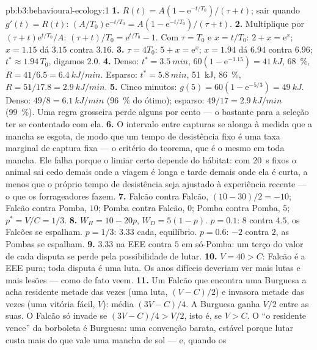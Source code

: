 \begin{solution}{pb:b3:behavioural-ecology:1}
\textbf{1.} $R(t) = A(1 - \mathrm{e}^{-t/T_{0}})/(\tau + t)$; sair quando
$g'(t) = R(t)$: $(A/T_{0})\mathrm{e}^{-t/T_{0}} = A(1 - \mathrm{e}^{-t/T_{0}})/
(\tau + t)$.
\textbf{2.} Multiplique por $(\tau + t)\mathrm{e}^{t/T_{0}}/A$: $(\tau + t)/T_{0}
= \mathrm{e}^{t/T_{0}} - 1$. Com $\tau = T_{0}$ e $x = t/T_{0}$: $2 + x =
\mathrm{e}^{x}$; $x = 1.15$ dá $3.15$ contra $3.16$.
\textbf{3.} $\tau = 4T_{0}$: $5 + x = \mathrm{e}^{x}$; $x = 1.94$ dá
$6.94$ contra $6.96$; $t^{*} \approx 1.94\,T_{0}$, digamos $2.0$.
\textbf{4.} Denso: $t^{*} = \qty{3.5}{min}$, $60(1 - \mathrm{e}^{-1.15}) =
\qty{41}{kJ}$, \qty{68}{\%}, $R = 41/6.5 = \qty{6.4}{kJ/min}$. Esparso:
$t^{*} = \qty{5.8}{min}$, \qty{51}{kJ}, \qty{86}{\%}, $R = 51/17.8 =
\qty{2.9}{kJ/min}$.
\textbf{5.} Cinco minutos: $g(5) = 60(1 - \mathrm{e}^{-5/3}) = \qty{49}{kJ}$.
Denso: $49/8 = \qty{6.1}{kJ/min}$ (\qty{96}{\%} do ótimo); esparso:
$49/17 = \qty{2.9}{kJ/min}$ (\qty{99}{\%}). Uma regra grosseira perde
alguns por cento --- o bastante para a seleção ter se contentado com ela.
\textbf{6.} O intervalo entre capturas se alonga à medida que a mancha se
esgota, de modo que um tempo de desistência fixo é uma taxa marginal de
captura fixa --- o critério do teorema, que é o mesmo em toda mancha. Ele
falha porque o limiar certo depende do hábitat: com \qty{20}{s} fixos o
animal sai cedo demais onde a viagem é longa e tarde demais onde ela é
curta, a menos que o próprio tempo de desistência seja ajustado à
experiência recente --- o que os forrageadores fazem.
\textbf{7.} Falcão contra Falcão, $(10 - 30)/2 = -10$; Falcão contra
Pomba, $10$; Pomba contra Falcão, $0$; Pomba contra Pomba, $5$; $p^{*} = V/C = 1/3$.
\textbf{8.} $W_{H} = 10 - 20p$, $W_{D} = 5(1 - p)$. $p = 0.1$: $8$ contra
$4.5$, os Falcões se espalham. $p = 1/3$: $3.33$ cada, equilíbrio. $p = 0.6$: $-2$ contra $2$, as Pombas se espalham.
\textbf{9.} $3.33$ na EEE contra $5$ em só-Pomba: um terço do valor de
cada disputa se perde pela possibilidade de lutar.
\textbf{10.} $V = 40 > C$: Falcão é a EEE pura; toda disputa é uma luta.
Os anos difíceis deveriam ver mais lutas e mais lesões --- como de fato
veem.
\textbf{11.} Um Falcão que encontra uma Burguesa a acha residente metade
das vezes (uma luta, $(V - C)/2$) e invasora metade das vezes (uma vitória
fácil, $V$): média $(3V - C)/4$. A Burguesa ganha $V/2$ entre as suas. O
Falcão só invade se $(3V - C)/4 > V/2$, isto é, se $V > C$. O ``o
residente vence'' da borboleta é Burguesa: uma convenção barata, estável
porque lutar custa mais do que vale uma mancha de sol --- e, quando os

\end{solution}
